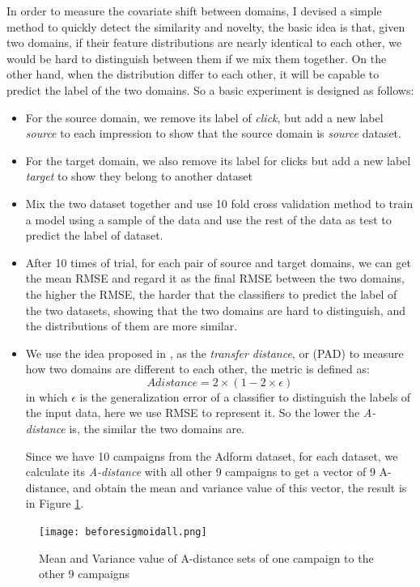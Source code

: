In order to measure the covariate shift between domains, I devised a simple method to quickly detect the similarity and novelty, the basic idea is that, given two domains, if their feature distributions are nearly identical to each other, we would be hard to distinguish between them if we mix them together. On the other hand, when the distribution differ to each other, it will be capable to predict the label of the two domains. So a basic experiment is designed as follows:
\begin{itemize}
\item For the source domain, we remove its label of \textit{click}, but add a new label \textit{source} to each impression to show that the source domain is \textit{source} dataset.
\item For the target domain, we also remove its label for clicks but add a new label \textit{target} to show they belong to another dataset
\item Mix the two dataset together and use 10 fold cross validation method to train a model using a sample of the data and use the rest of the data as test to predict the label of dataset.
\item After 10 times of trial, for each pair of source and target domains, we can get the mean RMSE and regard it as the final RMSE between the two domains, the higher the RMSE, the harder that the classifiers to predict the label of the two datasets, showing that the two domains are hard to distinguish, and the distributions of them are more similar.
\item We use the idea proposed in \cite{ben2010theory}, as the \textit{transfer distance}, or  (PAD) to measure how two domains are different to each other, the metric is defined as:
\begin{equation}
A distance = 2 \times (1-2 \times \epsilon)
\end{equation}
in which \(\epsilon\) is the generalization error of a classifier to distinguish the labels of the input data, here we use RMSE to represent it. So the lower the \textit{A-distance} is, the similar the two domains are.

Since we have 10 campaigns from the Adform dataset, for each dataset, we calculate its \textit{A-distance} with all other 9 campaigns to get a vector of 9 A-distance, and obtain the mean and variance value of this vector, the result is in Figure \ref{fig:beforeall}.

\end{itemize}
\begin{figure}[h]
\centering
\texttt{[image: beforesigmoidall.png]}
\caption{Mean and Variance value of A-distance sets of one campaign to the other 9 campaigns}
\label{fig:beforeall}
\end{figure}

